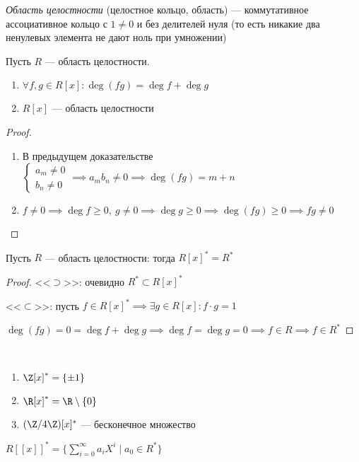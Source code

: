 \begin{defn}
    \emph{Область целостности} (целостное кольцо, область) --- коммутативное ассоциативное кольцо с $1 \neq 0$ и без делителей нуля (то есть никакие два ненулевых элемента не дают ноль при умножении)

\end{defn}

\begin{theorem-non}
    Пусть $R$ --- область целостности. 

    \begin{enumerate}
        \item $\forall f,g \in R[x]: \deg(fg) = \deg f + \deg g$
        
        \item $R[x]$ --- область целостности
    \end{enumerate}
\end{theorem-non}

\begin{proof}
    \begin{enumerate}
        \item В предыдущем доказательстве $\begin{cases}
            a_m \neq 0\\
            b_n \neq 0
        \end{cases} \implies a_m b_n \neq 0 \implies \deg(fg) = m + n$

        \item $f \neq 0 \implies \deg f \geq 0,~g \neq 0 \implies \deg g \geq 0 \implies \deg(fg) \geq 0 \implies fg \neq 0$
    \end{enumerate}
\end{proof}

\begin{follow}
    Пусть $R$ --- область целостности: тогда $R[x]^* = R^*$
\end{follow}

\begin{proof}
    
    <<$\supset$>>: очевидно $R^* \subset R[x]^*$

    <<$\subset$>>: пусть $f \in R[x]^* \implies \exists g \in R[x]: f \cdot g = 1$

    $\deg(fg) = 0 = \deg f + \deg g \implies \deg f = \deg g = 0 \implies f  \in R \implies f \in R^*$
\end{proof}

\begin{examples}~

    \begin{enumerate}
        \item $\Z[x]^* = \{\pm 1\}$
        
        \item $\R[x]^* = \R \setminus \{0\}$
    
        \item $(\Z/4\Z)[x]^*$ --- бесконечное множество
    \end{enumerate}
\end{examples}

\begin{exerc}
    $R[[x]]^* = \{ \sum\limits_{i = 0}^{\infty} a_iX^i \mid a_0 \in R^* \}$    
\end{exerc}
